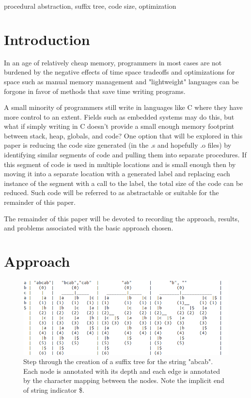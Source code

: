 \documentclass[9pt,nocopyrightspace]{sigplanconf}
\begin{document}


\keywords
procedural abstraction, suffix tree, code size, optimization

\section{Introduction}

In an age of relatively cheap memory, programmers in most cases are not burdened by the negative effects of time space tradeoffs and optimizations for space such as manual memory management and "lightweight" languages can be forgone in favor of methods that save time writing programs.

A small minority of programmers still write in languages like C where they have more control to an extent.
Fields such as embedded systems may do this, but what if simply writing in C doesn't provide a small enough memory footprint between stack, heap, globals, and code?
One option that will be explored in this paper is reducing the code size generated (in the .s and hopefully .o files) by identifying similar segments of code and pulling them into separate procedures.
If this segment of code is used in multiple locations and is small enough then by moving it into a separate location with a generated label and replacing each instance of the segment with a call to the label, the total size of the code can be reduced.
Such code will be referred to as abstractable or suitable for the remainder of this paper.

The remainder of this paper will be devoted to recording the approach, results, and problems associated with the basic approach chosen.

\section{Approach}

\begin{figure}
\includegraphics[width=\textwidth]{tree_diagram}
\caption{Step through the creation of a suffix tree for the string "abcab". Each node is annotated with its depth and each edge is annotated by the character mapping between the nodes. Note the implicit end of string indicator \$.}
\end{figure}
\end{document}
